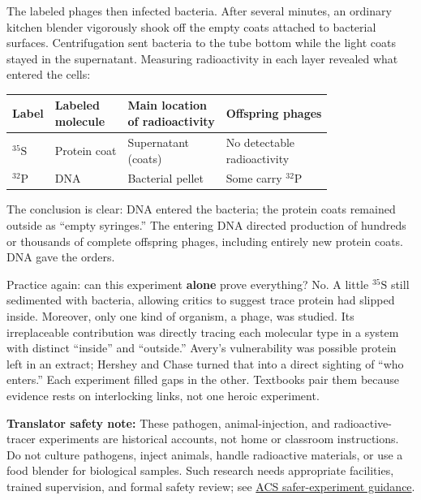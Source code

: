 The labeled phages then infected bacteria. After several minutes, an ordinary kitchen blender vigorously shook off the empty coats attached to bacterial surfaces. Centrifugation sent bacteria to the tube bottom while the light coats stayed in the supernatant. Measuring radioactivity in each layer revealed what entered the cells:

\begin{table}[htbp]
\centering
\begin{tabular}{llll}
\toprule
Label & \shortstack[l]{Labeled\\molecule} & \shortstack[l]{Main location\\of radioactivity} & Offspring phages \\
\midrule
$^{35}\mathrm{S}$ & Protein coat & \shortstack[l]{Supernatant\\(coats)} & \shortstack[l]{No detectable\\radioactivity} \\
$^{32}\mathrm{P}$ & DNA & Bacterial pellet & \shortstack[l]{Some carry\\$^{32}\mathrm{P}$} \\
\bottomrule
\end{tabular}
\end{table}

The conclusion is clear: DNA entered the bacteria; the protein coats remained outside as ``empty syringes.'' The entering DNA directed production of hundreds or thousands of complete offspring phages, including entirely new protein coats. DNA gave the orders.

Practice again: can this experiment \textbf{alone} prove everything? No. A little $^{35}\mathrm{S}$ still sedimented with bacteria, allowing critics to suggest trace protein had slipped inside. Moreover, only one kind of organism, a phage, was studied. Its irreplaceable contribution was directly tracing each molecular type in a system with distinct ``inside'' and ``outside.'' Avery's vulnerability was possible protein left in an extract; Hershey and Chase turned that into a direct sighting of ``who enters.'' Each experiment filled gaps in the other. Textbooks pair them because evidence rests on interlocking links, not one heroic experiment.

\textbf{Translator safety note:} These pathogen, animal-injection, and radioactive-tracer experiments are historical accounts, not home or classroom instructions. Do not culture pathogens, inject animals, handle radioactive materials, or use a food blender for biological samples. Such research needs appropriate facilities, trained supervision, and formal safety review; see \href{https://institute.acs.org/acs-center/lab-safety/education-training/safer-experiments.html}{ACS safer-experiment guidance}.

